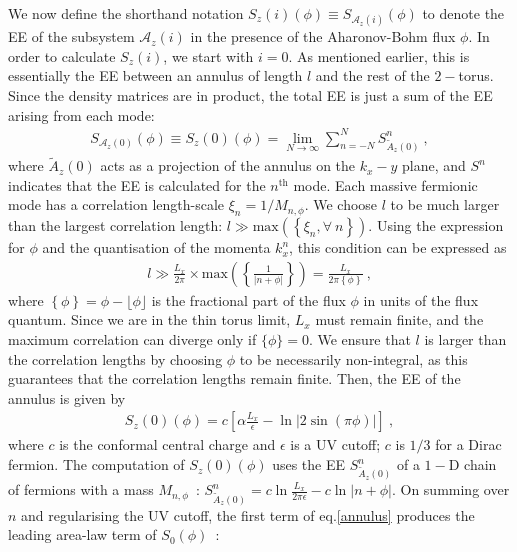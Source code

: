 We now define the shorthand notation \(S_{z}(i)(\phi) \equiv S_{\mathcal{A}_{z}(i)}(\phi)\) to denote the EE of the subsystem \(\mathcal{A}_{z}(i)\) in the presence of the Aharonov-Bohm flux \(\phi\). In order to calculate \(S_{z}(i)\), we start with \(i=0\). As mentioned earlier, this is essentially the EE between an annulus of length \(l\) and the rest of the \(2-\)torus. Since the density matrices are in product, the total EE is just a sum of the EE arising from each mode:
\begin{equation}\begin{aligned}
	S_{\mathcal{A}_{z}(0)}(\phi) \equiv S_{z}(0)(\phi) = \lim_{N \to \infty}\sum_{n=-N}^N S_{\widetilde{A}_{z}(0)}^n~,
\end{aligned}\end{equation}
where \(\widetilde{A}_{z}(0)\) acts as a projection of the annulus on the \(k_x-y\) plane, and
\(S^n\) indicates that the EE is calculated for the \(n^\text{th}\) mode. Each massive fermionic mode has a correlation length-scale \(\xi_n = 1/M_{n,\phi}\). We choose \(l\) to be much larger than the largest correlation length: \(l \gg \text{max}\left(\left\{\xi_n,\forall~n\right\}\right)\). Using the expression for \(\phi\) and the quantisation of the momenta \(k^n_x\), this condition can be expressed as
\begin{equation}\begin{aligned}
	l \gg \frac{L_x}{2\pi}\times \text{max} \left(\left\{\frac{1}{|n + \phi|}\right\}\right) = \frac{L_x}{2\pi \left\{\phi\right\}}~,
\end{aligned}\end{equation}
where \(\left\{\phi\right\} = \phi - \lfloor \phi \rfloor\) is the fractional part of the flux \(\phi\) in units of the flux quantum. Since we are in the thin torus limit, \(L_x\) must remain finite, and the maximum correlation can diverge only if \(\{\phi\}=0\). We ensure that \(l\) is larger than the correlation lengths by choosing \(\phi\) to be necessarily non-integral, as this guarantees that the correlation lengths remain finite. Then, the EE of the annulus is given by~\cite{Arias_2015,Chen_2017}
\begin{equation}\begin{aligned}
	\label{annulus}
	S_{z}(0)(\phi) = c\left[\alpha \frac{L_x}{\epsilon} - \ln \big|2\sin\left(\pi\phi\right) \big|\right]~,
\end{aligned}\end{equation}
where \(c\) is the conformal central charge and \(\epsilon\) is a UV cutoff; \(c\) is \(1/3\) for a Dirac fermion. The computation of \(S_{z}(0)(\phi)\) uses the EE \(S_{\widetilde{A}_{z}(0)}^n\) of a \(1-\)D chain of fermions with a mass \(M_{n,\phi}\)~\cite{calabrese2004,Casini_2009}: \(S_{\widetilde{A}_{z}(0)}^n = c\ln \frac{L_x}{2\pi\epsilon} - c\ln |n+\phi|\). On summing over \(n\) and regularising the UV cutoff, the first term of eq.\eqref{annulus} produces the leading area-law term of \(S_0(\phi)\)~\cite{Chen_2017}:
